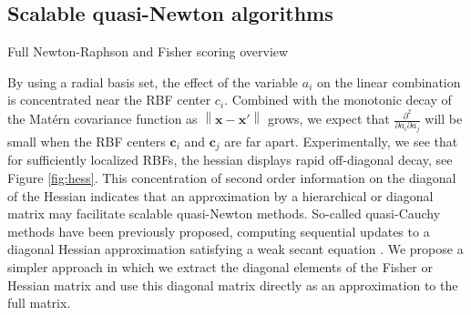 \documentclass{article}
\newcommand{\norm}[1]{\left\lVert#1\right\rVert}
\numberwithin{equation}{section}
\newcommand{\x}{\bm{x}}
\newcommand{\xp}{\bm{x'}}
\renewcommand{\c}{\bm{c}}
\begin{document}
\subsection{Scalable quasi-Newton algorithms}
Full Newton-Raphson and Fisher scoring overview

By using a radial basis set, the effect of the variable $a_i$ on the linear combination is concentrated near the RBF center $c_i$. Combined with the monotonic decay of the Mat\'ern covariance function as $\norm{\x - \xp}$ grows, we expect that $\frac{\partial^2}{\partial a_i \partial a_j}$ will be small when the RBF centers $\c_i$ and $\c_j$ are far apart. Experimentally, we see that for sufficiently localized RBFs, the hessian displays rapid off-diagonal decay, see Figure \ref{fig:hess}. This concentration of second order information on the diagonal of the Hessian indicates that an approximation by a hierarchical or diagonal matrix may facilitate scalable quasi-Newton methods. So-called quasi-Cauchy methods \cite{zhu1999quasi, andrei2019diagonal} have been previously proposed, computing sequential updates to a diagonal Hessian approximation satisfying a weak secant equation \cite{dennis1993sizing}. We propose a simpler approach in which we extract the diagonal elements of the Fisher or Hessian matrix and use this diagonal matrix directly as an approximation to the full matrix.

\end{document}
